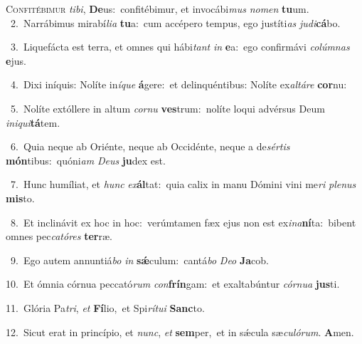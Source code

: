 \lettrine{\initial\textcolor{\initialcolor}{C}}{onfitébimur} \textit{ti}\-\textit{bi}, \textbf{De}\-us:~\star confitébimur, et invocábi\textit{mus} \textit{no}\-\textit{men} \textbf{tu}\-um.\\
{\numbfont\textcolor{\numbcolor}{~2.}}~Narrábimus mirabí\-\textit{li}\-\textit{a} \textbf{tu}\-a:~\star cum accépero tempus, ego justíti\textit{as} \textit{ju}\-\textit{di}\textbf{cá}bo.\par
{\numbfont\textcolor{\numbcolor}{~3.}}~Liquefácta est terra, et omnes qui hábi\textit{tant} \textit{in} \textbf{e}\-a:~\star ego confirmávi \textit{co}\-\textit{lúm}\textit{nas} \textbf{e}\-jus.\par
{\numbfont\textcolor{\numbcolor}{~4.}}~Dixi iníquis: Nolíte in\-\textit{í}\-\textit{que} \textbf{á}\-gere:~\star et delinquéntibus: Nolíte ex\-\textit{al}\-\textit{tá}\textit{re} \textbf{cor}\-nu:\par
{\numbfont\textcolor{\numbcolor}{~5.}}~Nolíte extóllere in altum \textit{cor}\-\textit{nu} \textbf{ves}\-trum:~\star nolíte loqui advérsus Deum \textit{in}\-\textit{i}\textit{qui}\textbf{tá}tem.\par
{\numbfont\textcolor{\numbcolor}{~6.}}~Quia neque ab Oriénte, neque ab Occidénte, neque a de\-\textit{sér}\-\textit{tis} \textbf{món}\-tibus:~\star quóni\textit{am} \textit{De}\-\textit{us} \textbf{ju}\-dex est.\par
{\numbfont\textcolor{\numbcolor}{~7.}}~Hunc humíliat, et \textit{hunc} \textit{ex}\-\textbf{ál}tat:~\star quia calix in manu Dómini vini me\textit{ri} \textit{ple}\-\textit{nus} \textbf{mis}\-to.\par
{\numbfont\textcolor{\numbcolor}{~8.}}~Et inclinávit ex hoc in hoc:~\dagger verúmtamen fæx ejus non est ex\-\textit{i}\-\textit{na}\textbf{ní}ta:~\star bibent omnes pec\-\textit{ca}\-\textit{tó}\textit{res} \textbf{ter}\-ræ.\par
{\numbfont\textcolor{\numbcolor}{~9.}}~Ego autem annuntiá\textit{bo} \textit{in} \textbf{sǽ}\-culum:~\star cantá\textit{bo} \textit{De}\-\textit{o} \textbf{Ja}\-cob.\par
{\numbfont\textcolor{\numbcolor}{10.}}~Et ómnia córnua peccató\textit{rum} \textit{con}\-\textbf{frín}gam:~\star et exaltabúntur \textit{cór}\-\textit{nu}\textit{a} \textbf{jus}\-ti.\par
{\numbfont\textcolor{\numbcolor}{11.}}~Glória Pa\-\textit{tri}\-, \textit{et} \textbf{Fí}\-lio,~\star et Spi\-\textit{rí}\-\textit{tu}\textit{i} \textbf{Sanc}\-to.\par
{\numbfont\textcolor{\numbcolor}{12.}}~Sicut erat in princípio, et \textit{nunc}\-, \textit{et} \textbf{sem}\-per,~\star et in sǽcula sæ\-\textit{cu}\-\textit{ló}\textit{rum}. \textbf{A}\-men.\par
